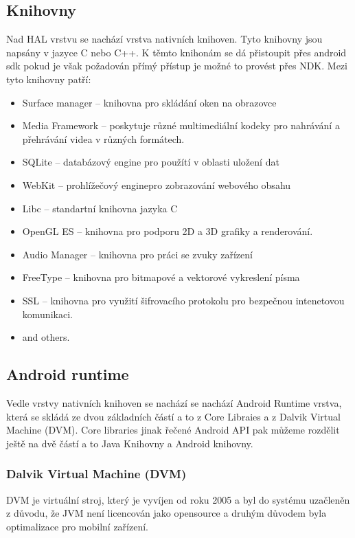 \subsection{Knihovny}
Nad HAL vrstvu se nachází vrstva nativních knihoven. Tyto knihovny jsou napsány v jazyce C nebo C++. K těmto knihonám se dá přistoupit přes android sdk pokud je však požadován přímý přístup je možné to provést přes NDK. Mezi tyto knihovny patří:
\begin{itemize} %
\item Surface manager -- knihovna pro skládání oken na obrazovce
\item Media Framework -- poskytuje různé multimediální kodeky pro nahrávání a přehrávání videa v různých formátech.
\item SQLite -- databázový engine pro použítí v oblasti uložení dat
\item WebKit -- prohlížečový enginepro  zobrazování webového obsahu
\item Libc -- standartní knihovna jazyka C 
\item OpenGL ES -- knihovna pro podporu 2D a 3D grafiky a renderování.
\item Audio Manager -- knihovna pro práci se zvuky zařízení
\item FreeType -- knihovna pro bitmapové a vektorové vykreslení písma
\item SSL -- knihovna pro využití šifrovacího protokolu pro bezpečnou intenetovou komunikaci.
\item and others.
\end{itemize}


\subsection{Android runtime}
Vedle vrstvy nativních knihoven se nachází se nachází Android Runtime vrstva, která se skládá ze dvou základních částí a to z Core Libraies a z Dalvik Virtual Machine (DVM). Core libraries jinak řečené Android API pak můžeme rozdělit ještě na dvě částí a to Java Knihovny a Android knihovny.

\subsubsection{Dalvik Virtual Machine (DVM)}
DVM je virtuální stroj, který je vyvíjen od roku 2005 a byl do systému uzačleněn z důvodu, že JVM není licencován jako opensource a druhým důvodem byla optimalizace pro mobilní zařízení.

